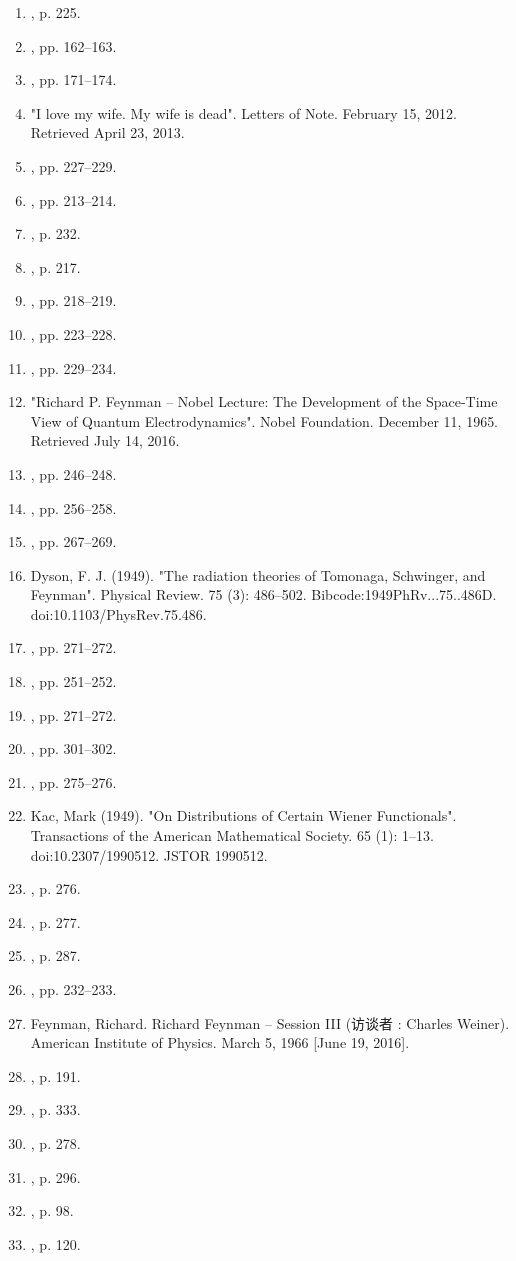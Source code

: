 \begin{enumerate}
\item , p. 225.
\item , pp. 162–163.
\item , pp. 171–174.
\item "I love my wife. My wife is dead". Letters of Note. February 15, 2012. Retrieved April 23, 2013.
\item , pp. 227–229.
\item , pp. 213–214.
\item , p. 232.
\item , p. 217.
\item , pp. 218–219.
\item , pp. 223–228.
\item , pp. 229–234.
\item "Richard P. Feynman – Nobel Lecture: The Development of the Space-Time View of Quantum Electrodynamics". Nobel Foundation. December 11, 1965. Retrieved July 14, 2016.
\item , pp. 246–248.
\item , pp. 256–258.
\item , pp. 267–269.
\item Dyson, F. J. (1949). "The radiation theories of Tomonaga, Schwinger, and Feynman". Physical Review. 75 (3): 486–502. Bibcode:1949PhRv...75..486D. doi:10.1103/PhysRev.75.486.
\item , pp. 271–272.
\item , pp. 251–252.
\item , pp. 271–272.
\item , pp. 301–302.
\item , pp. 275–276.
\item Kac, Mark (1949). "On Distributions of Certain Wiener Functionals". Transactions of the American Mathematical Society. 65 (1): 1–13. doi:10.2307/1990512. JSTOR 1990512.
\item , p. 276.
\item , p. 277.
\item , p. 287.
\item , pp. 232–233.
\item Feynman, Richard. Richard Feynman – Session III (访谈者 : Charles Weiner). American Institute of Physics. March 5, 1966 [June 19, 2016].
\item , p. 191.
\item , p. 333.
\item , p. 278.
\item , p. 296.
\item , p. 98.
\item , p. 120.

\end{enumerate}
